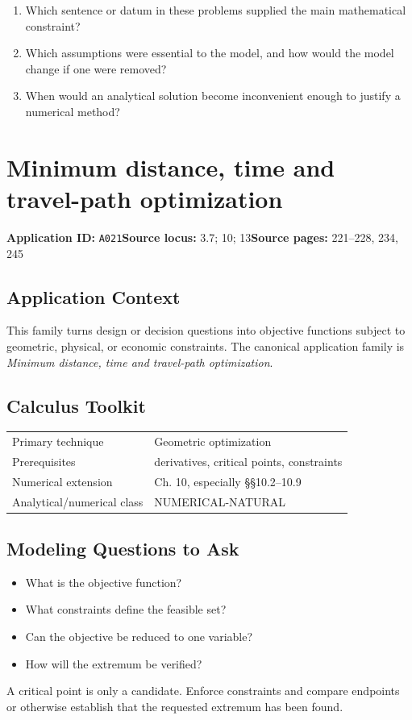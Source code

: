 \documentclass[11pt]{book}
\newcommand{\pid}[1]{\texttt{#1}}
\begin{document}
\begin{reflectionbox}\begin{enumerate}
\item Which sentence or datum in these problems supplied the main mathematical constraint?
\item Which assumptions were essential to the model, and how would the model change if one were removed?
\item When would an analytical solution become inconvenient enough to justify a numerical method?
\end{enumerate}\end{reflectionbox}
\chapter{Minimum distance, time and travel-path optimization}\label{app:A021}
\textbf{Application ID:} \pid{A021}\quad \textbf{Source locus:} 3.7; 10; 13\quad \textbf{Source pages:} 221–228, 234, 245
\section*{Application Context}
This family turns design or decision questions into objective functions subject to geometric, physical, or economic constraints. The canonical application family is \emph{Minimum distance, time and travel-path optimization}.
\section*{Calculus Toolkit}
\begin{tabularx}{\textwidth}{@{}lX@{}}\toprule
Primary technique & Geometric optimization \\
Prerequisites & derivatives, critical points, constraints \\
Numerical extension & Ch. 10, especially §§10.2–10.9 \\
Analytical/numerical class & NUMERICAL-NATURAL \\
\bottomrule\end{tabularx}
\section*{Modeling Questions to Ask}\begin{itemize}
\item What is the objective function?
\item What constraints define the feasible set?
\item Can the objective be reduced to one variable?
\item How will the extremum be verified?
\end{itemize}
\begin{errorbox}A critical point is only a candidate. Enforce constraints and compare endpoints or otherwise establish that the requested extremum has been found.\end{errorbox}
\end{document}
